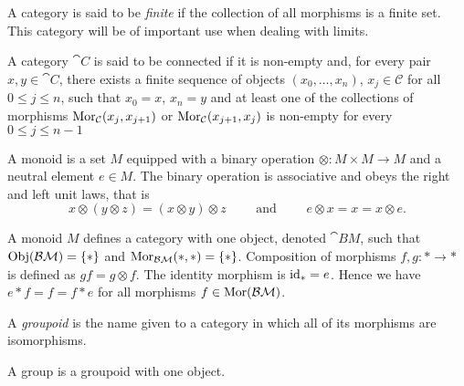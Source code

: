 \begin{definition}
\label{def:finite-category}
A category is said to be \emph{finite} if the collection of all morphisms is a
finite set. This category will be of important use when dealing with limits.
\end{definition}

\begin{definition}
\label{def:connected-category}
A category \(\cat C\) is said to be connected if it is non-empty and, for every
pair \(x, y \in \cat C\), there exists a finite sequence of objects \((x_0,
\dots, x_n)\), \(x_j \in \mathcal C\) for all \(0 \leq j \leq n\), such that
\(x_0 = x\), \(x_n = y\) and at least one of the collections of morphisms
\(\operatorname{Mor}_{\mathcal C}(x_j, x_{j+1})\) or \(\operatorname{Mor}_{\mathcal C}(x_{j+1}, x_j)\) is non-empty
for every \(0 \leq j \leq n - 1\)
\end{definition}


\begin{definition}[Monoid]\label{def: monoid}
A monoid is a set \(M\) equipped with a binary operation \(\otimes: M \times M
\to M\) and a neutral element \(e \in M\). The binary operation is associative
and obeys the right and left unit laws, that is
\[
  x \otimes (y \otimes z) = (x \otimes y) \otimes z \qquad \text{ and } \qquad
  e \otimes x = x = x \otimes e.
\]
\end{definition}

\begin{example}
A monoid \(M\) defines a category with one object, denoted \(\cat{BM}\), such
that \(\operatorname{Obj}(\mathcal{BM}) = \{*\}\) and \(\operatorname{Mor}_{\mathcal{BM}}(*, *) =
\{*\}\). Composition of morphisms \(f, g: * \to *\) is defined as \(g f = g
\otimes f\). The identity morphism is \(\operatorname{id}_* = e\). Hence we have \(e * f = f =
f * e\) for all morphisms \(f \in \operatorname{Mor}(\mathcal{BM})\).
\end{example}

\begin{definition}[Groupoids]\label{def: groupoids}
A \emph{groupoid} is the name given to a category in which all of its
morphisms are isomorphisms.
\end{definition}

\begin{definition}[Group]\label{def: group}
A group is a groupoid with one object.
\end{definition}

